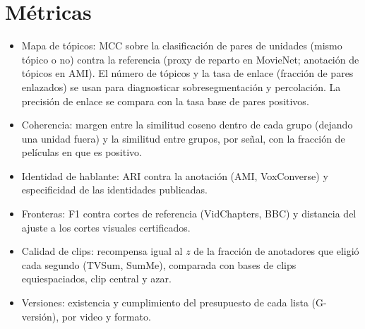 \section{Métricas}

\begin{itemize}
  \item Mapa de tópicos: MCC sobre la clasificación de pares de unidades (mismo tópico o
        no) contra la referencia (proxy de reparto en MovieNet; anotación de tópicos en
        AMI). El número de tópicos y la tasa de enlace (fracción de pares enlazados) se usan
        para diagnosticar sobresegmentación y percolación. La precisión de enlace se compara
        con la tasa base de pares positivos.
  \item Coherencia: margen entre la similitud coseno dentro de cada grupo (dejando una unidad
        fuera) y la similitud entre grupos, por señal, con la fracción de películas en que es
        positivo.
  \item Identidad de hablante: ARI contra la anotación (AMI, VoxConverse) y especificidad de
        las identidades publicadas.
  \item Fronteras: F1 contra cortes de referencia (VidChapters, BBC) y distancia del ajuste a
        los cortes visuales certificados.
  \item Calidad de clips: recompensa igual al $z$ de la fracción de anotadores que eligió cada
        segundo (TVSum, SumMe), comparada con bases de clips equiespaciados, clip central y
        azar.
  \item Versiones: existencia y cumplimiento del presupuesto de cada lista (G-versión), por
        video y formato.
\end{itemize}
